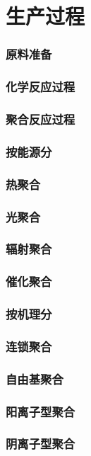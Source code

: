 \documentclass[UTF8]{../../ApplicationUniverse}
\begin{document}
\section{生产过程}
    \subsubsection{原料准备}
    \subsubsection{化学反应过程}
    \subsubsection{聚合反应过程}
        \subsubsection{按能源分}
            \subsubsection{热聚合}
            \subsubsection{光聚合}
            \subsubsection{辐射聚合}
            \subsubsection{催化聚合}
        \subsubsection{按机理分}
            \subsubsection{连锁聚合}
            \subsubsection{自由基聚合}
            \subsubsection{阳离子型聚合}
            \subsubsection{阴离子型聚合}
\end{document}
